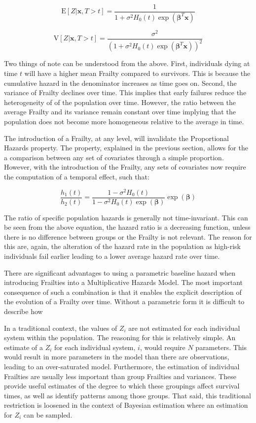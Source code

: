 $$\mathrm{E}[Z|\textbf{x},  T > t ] = \frac{1}{1 + \sigma^2 H_0(t) \exp(\boldsymbol\beta^T \textbf{x})} $$

$$ \mathrm{V}[Z|\textbf{x},  T > t ] = \frac{\sigma^2}{(1 + \sigma^2 H_0(t) \exp(\boldsymbol\beta^T \textbf{x}))^2} $$

Two things of note can be understood from the above. First, individuals dying at time $t$ will have a higher mean Frailty compared to survivors. This is because the cumulative hazard in the denominator increases as time goes on. Second, the variance of Frailty declines over time. This implies that early failures reduce the heterogeneity of of the population over time. However, the ratio between the average Frailty and its variance remain constant over time implying that the population does not become more homogeneous relative to the average in time\cite{Wienke2010}.

The introduction of a Frailty, at any level, will invalidate the Proportional Hazards property\cite{Kleinbaum2005}. The property, explained in the previous section, allows for the a comparison between any set of covariates through a simple proportion. However, with the introduction of the Frailty, any sets of covariates now require the computation of a temporal effect, such that:

$$ \frac{h_1(t)}{h_2(t)} = \frac{1 - \sigma^2 H_0(t)}{1 - \sigma^2 H_0(t) \exp(\boldsymbol\beta)} \exp(\boldsymbol\beta) $$

The ratio of specific population hazards is generally not time-invariant. This can be seen from the above equation, the hazard ratio is a decreasing function, unless there is no difference between groups or the Frailty is not relevant. The reason for this are, again, the alteration of the hazard rate in the population as high-risk individuals fail earlier leading to a lower average hazard rate over time.

There are significant advantages to using a parametric baseline hazard when introducing Frailties into a Multiplicative Hazards Model. The most important consequence of such a combination is that it enables the explicit description of the evolution of a Frailty over time. Without a parametric form it is difficult to describe how 

In a traditional context, the values of $Z_i$ are not estimated for each individual system within the population. The reasoning for this is relatively simple. An estimate of a $Z_i$ for each individual system, $i$, would require $N$ parameters. This would result in more parameters in the model than there are observations, leading to an over-saturated model. Furthermore, the estimation of individual Frailties are usually less important than group Frailties and variances. These provide useful estimates of the degree to which these groupings affect survival times, as well as identify patterns among those groups. That said, this traditional restriction is loosened in the context of Bayesian estimation where an estimation for $Z_i$ can be sampled.




